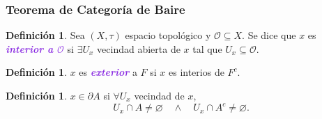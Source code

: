 \documentclass{article}
\theoremstyle{definition}
\newtheorem{definition}[theorem]{Definición}
\theoremstyle{remark}
\numberwithin{equation}{section}
\renewcommand{\O}{\mathcal{O}}
\renewcommand{\t}{\tau}
\newcommand{\wea}[1]{\textcolor{BlueViolet}{\textbf{\emph{#1}}}}
\begin{document}
\newpage
\subsubsection{Teorema de Categoría de Baire}

\begin{definition}
  Sea $(X,\t)$ espacio topológico y $\O \subseteq X$. Se dice que $x$ es \wea{interior a $\O$} si $\exists U_x$ vecindad abierta de $x$ tal que $U_x \subseteq \O$.
\end{definition}

\begin{definition}
  $x$ es \wea{exterior} a $F$ si $x$ es interios de $F^c$.
\end{definition}

\begin{definition}
  $x \in \partial A$ si $\forall U_x$ vecindad de $x$,
  \[U_x \cap A \neq \varnothing \quad\land\quad U_x \cap A^c \neq \varnothing.\]
\end{definition}
\end{document}
